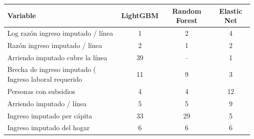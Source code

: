 \begin{tabular}{lccc}
\toprule
\textbf{Variable} & \textbf{LightGBM} & \textbf{Random Forest} & \textbf{Elastic Net} \\
\midrule
Log razón ingreso imputado / línea & 1 & 2 & 4 \\
Razón ingreso imputado / línea & 2 & 1 & 2 \\
Arriendo imputado cubre la línea & 39 & -- & 1 \\
Brecha de ingreso imputado (%
Ingreso laboral requerido & 11 & 9 & 3 \\
Personas con subsidios & 4 & 4 & 12 \\
Arriendo imputado / línea & 5 & 5 & 9 \\
Ingreso imputado per cápita & 33 & 29 & 5 \\
Ingreso imputado del hogar & 6 & 6 & 6 \\
\bottomrule
\end{tabular}
